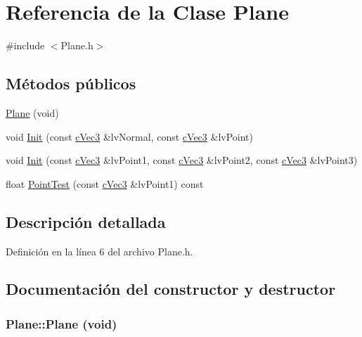 \hypertarget{class_plane}{
\section{Referencia de la Clase Plane}
\label{class_plane}
}


{\ttfamily \#include $<$Plane.h$>$}

\subsection*{Métodos públicos}
\begin{DoxyCompactItemize}
\item 
\hyperlink{class_plane_a2ee6656084f979accccf1ad8414a33d9}{Plane} (void)
\item 
void \hyperlink{class_plane_a5a04a950b7774c49cbc786680653dd9b}{Init} (const \hyperlink{structc_vec3}{cVec3} \&lvNormal, const \hyperlink{structc_vec3}{cVec3} \&lvPoint)
\item 
void \hyperlink{class_plane_a56118cdc77778a635a2ad09a95924f5f}{Init} (const \hyperlink{structc_vec3}{cVec3} \&lvPoint1, const \hyperlink{structc_vec3}{cVec3} \&lvPoint2, const \hyperlink{structc_vec3}{cVec3} \&lvPoint3)
\item 
float \hyperlink{class_plane_a253f2b49f805d05dfc79569e1da0c021}{PointTest} (const \hyperlink{structc_vec3}{cVec3} \&lvPoint1) const 
\end{DoxyCompactItemize}


\subsection{Descripción detallada}


Definición en la línea 6 del archivo Plane.h.



\subsection{Documentación del constructor y destructor}
\hypertarget{class_plane_a2ee6656084f979accccf1ad8414a33d9}{
\subsubsection[{Plane}]{\setlength{\rightskip}{0pt plus 5cm}Plane::Plane (void)}}
\label{class_plane_a2ee6656084f979accccf1ad8414a33d9}


